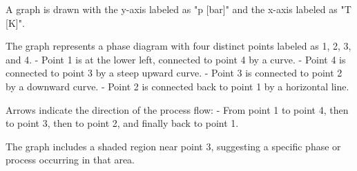 A graph is drawn with the y-axis labeled as "p [bar]" and the x-axis labeled as "T [K]".  

The graph represents a phase diagram with four distinct points labeled as 1, 2, 3, and 4.  
- Point 1 is at the lower left, connected to point 4 by a curve.  
- Point 4 is connected to point 3 by a steep upward curve.  
- Point 3 is connected to point 2 by a downward curve.  
- Point 2 is connected back to point 1 by a horizontal line.  

Arrows indicate the direction of the process flow:  
- From point 1 to point 4, then to point 3, then to point 2, and finally back to point 1.  

The graph includes a shaded region near point 3, suggesting a specific phase or process occurring in that area.